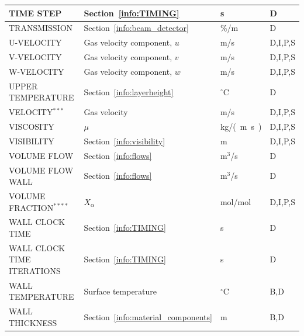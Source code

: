 \documentclass[11pt]{book}
\begin{document}
\begin{longtable}{@{\extracolsep{\fill}}|l|l|l|l|}
{\ct TIME STEP}                                 & Section~\ref{info:TIMING}                     & s              & D            \\ \hline
{\ct TRANSMISSION}                              & Section~\ref{info:beam_detector}              & \%/m           & D            \\ \hline
{\ct U-VELOCITY}                                & Gas velocity component, $u$                   & m/s            & D,I,P,S      \\ \hline
{\ct V-VELOCITY}                                & Gas velocity component, $v$                   & m/s            & D,I,P,S      \\ \hline
{\ct W-VELOCITY}                                & Gas velocity component, $w$                   & m/s            & D,I,P,S      \\ \hline
{\ct UPPER TEMPERATURE}                         & Section~\ref{info:layerheight}                & $^\circ$C      & D            \\ \hline
{\ct VELOCITY}$^{***}$                          & Gas velocity                                  & m/s            & D,I,P,S      \\ \hline
{\ct VISCOSITY}                                 & $\mu$                                         & \si{kg/(m.s)}  & D,I,P,S      \\ \hline
{\ct VISIBILITY}                                & Section~\ref{info:visibility}                 & m              & D,I,P,S      \\ \hline
{\ct VOLUME FLOW}                               & Section~\ref{info:flows}                      & m$^3$/s        & D            \\ \hline
{\ct VOLUME FLOW WALL}                          & Section~\ref{info:flows}                      & m$^3$/s        & D            \\ \hline
{\ct VOLUME FRACTION}$^{****}$                  & $X_\alpha$                                    & mol/mol        & D,I,P,S      \\ \hline
{\ct WALL CLOCK TIME}                           & Section~\ref{info:TIMING}                     & s              & D            \\ \hline
{\ct WALL CLOCK TIME ITERATIONS}                & Section~\ref{info:TIMING}                     & s              & D            \\ \hline
{\ct WALL TEMPERATURE}                          & Surface temperature                           & $^\circ$C      & B,D          \\ \hline
{\ct WALL THICKNESS}                            & Section~\ref{info:material_components}        & m              & B,D          \\ \hline
\end{longtable}
\end{document}
